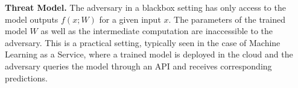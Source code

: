 \noindent\textbf{Threat Model.} The adversary in a blackbox setting has only access to the model outputs $f(x;W)$ for a given input $x$.
The parameters of the trained model $W$ as well as the intermediate computation are inaccessible to the adversary.
This is a practical setting, typically seen in the case of Machine Learning as a Service, where a trained model is deployed in the cloud and the adversary queries the model through an API and receives corresponding predictions.



\begin{figure}[!htb]
    \centering
    \begin{minipage}[b]{1\linewidth}
    \centering


\end{minipage}
\end{figure}
